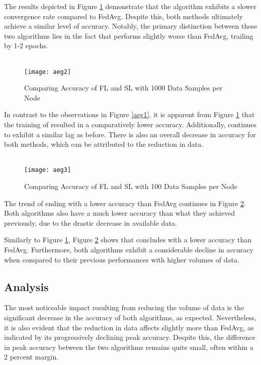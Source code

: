 The results depicted in Figure \ref{aeg2} demonstrate that the \SL algorithm exhibits a slower convergence rate compared to FedAvg. Despite this, both methods ultimately achieve a similar level of accuracy. Notably, the primary distinction between these two algorithms lies in the fact that \SL performs slightly worse than FedAvg, trailing by 1-2 epochs.

\begin{figure}[H]
	 \\
	\texttt{[image: aeg2]}
	\caption{Comparing Accuracy of FL and SL with 1000 Data Samples per Node}
	\label{aeg2}
\end{figure}

In contrast to the observations in Figure \ref{aeg1}, it is apparent from Figure \ref{aeg2} that the training of \SL resulted in a comparatively lower accuracy. Additionally, \SL continues to exhibit a similar lag as before. There is also an overall decrease in accuracy for both methods, which can be attributed to the reduction in data.

\begin{figure}[H]
	 \\
	\texttt{[image: aeg3]}
	\caption{Comparing Accuracy of FL and SL with 100 Data Samples per Node}
	\label{aeg3}
\end{figure}

The trend of \SL ending with a lower accuracy than FedAvg continues in Figure \ref{aeg3}. Both algorithms also have a much lower accuracy than what they achieved previously, due to the drastic decrease in available data.

Similarly to Figure \ref{aeg2}, Figure \ref{aeg3} shows that \SL concludes with a lower accuracy than FedAvg. Furthermore, both algorithms exhibit a considerable decline in accuracy when compared to their previous performances with higher volumes of data.

\subsection{Analysis}

The most noticeable impact resulting from reducing the volume of data is the significant decrease in the accuracy of both algorithms, as expected. Nevertheless, it is also evident that the reduction in data affects \SL slightly more than FedAvg, as indicated by its progressively declining peak accuracy. Despite this, the difference in peak accuracy between the two algorithms remains quite small, often within a 2 percent margin.

